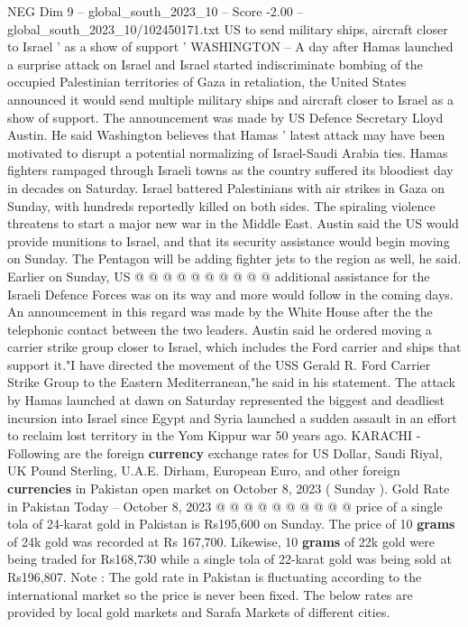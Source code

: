 \begin{textsample}{NEG Dim 9 – global\_south\_2023\_10 – Score -2.00 – global\_south\_2023\_10/102450171.txt}  \label{ex:f9_neg_420}
US to send military ships, aircraft closer to Israel ' as a show of support ' WASHINGTON -- A day after Hamas launched a surprise attack on Israel and Israel started indiscriminate bombing of the occupied Palestinian territories of Gaza in retaliation, the United States announced it would send multiple military ships and aircraft closer to Israel as a show of support.
The announcement was made by US Defence Secretary Lloyd Austin.
He said Washington believes that Hamas ' latest attack may have been motivated to disrupt a potential normalizing of Israel-Saudi Arabia ties.
Hamas fighters rampaged through Israeli towns as the country suffered its bloodiest day in decades on Saturday.
Israel battered Palestinians with air strikes in Gaza on Sunday, with hundreds reportedly killed on both sides.
The spiraling violence threatens to start a major new war in the Middle East.
Austin said the US would provide munitions to Israel, and that its security assistance would begin moving on Sunday.
The Pentagon will be adding fighter jets to the region as well, he said.
Earlier on Sunday, US @ @ @ @ @ @ @ @ @ @ additional assistance for the Israeli Defence Forces was on its way and more would follow in the coming days.
An announcement in this regard was made by the White House after the the telephonic contact between the two leaders.
Austin said he ordered moving a carrier strike group closer to Israel, which includes the Ford carrier and ships that support it."I have directed the movement of the USS Gerald R.
Ford Carrier Strike Group to the Eastern Mediterranean,"he said in his statement.
The attack by Hamas launched at dawn on Saturday represented the biggest and deadliest incursion into Israel since Egypt and Syria launched a sudden assault in an effort to reclaim lost territory in the Yom Kippur war 50 years ago.
KARACHI - Following are the foreign \textbf{currency} exchange rates for US Dollar, Saudi Riyal, UK Pound Sterling, U.A.E.
Dirham, European Euro, and other foreign \textbf{currencies} in Pakistan open market on October 8, 2023 ( Sunday ).
Gold Rate in Pakistan Today -- October 8, 2023 @ @ @ @ @ @ @ @ @ @ price of a single tola of 24-karat gold in Pakistan is Rs195,600 on Sunday.
The price of 10 \textbf{grams} of 24k gold was recorded at Rs 167,700.
Likewise, 10 \textbf{grams} of 22k gold were being traded for Rs168,730 while a single tola of 22-karat gold was being sold at Rs196,807.
Note : The gold rate in Pakistan is fluctuating according to the international market so the price is never been fixed.
The below rates are provided by local gold markets and Sarafa Markets of different cities.

\end{textsample}
